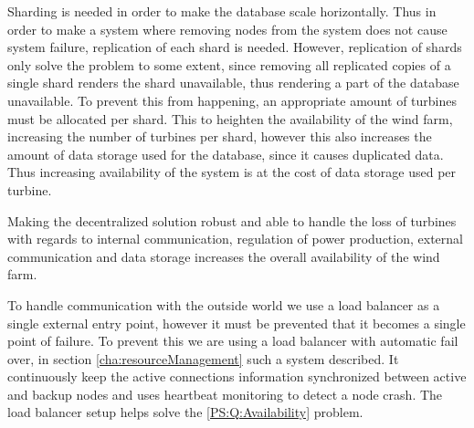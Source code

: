 Sharding is needed in order to make the database scale horizontally. Thus in order to make a system where removing nodes from the system does not cause system failure, replication of each shard is needed. However, replication of shards only solve the problem to some extent, since removing all replicated copies of a single shard renders the shard unavailable, thus rendering a part of the database unavailable. To prevent this from happening, an appropriate amount of turbines must be allocated per shard. This to heighten the availability of the wind farm, increasing the number of turbines per shard, however this also increases the amount of data storage used for the database, since it causes duplicated data. Thus increasing availability of the system is at the cost of data storage used per turbine.

Making the decentralized solution robust and able to handle the loss of turbines with regards to internal communication, regulation of power production, external communication and data storage increases the overall availability of the wind farm. %

To handle communication with the outside world we use a load balancer as a single external entry point, 
however it must be prevented that it becomes a single point of failure.
To prevent this we are using a load balancer with automatic fail over, in section \cref{cha:resourceManagement} such a system described.
It continuously keep the active connections information synchronized between active and backup nodes and uses heartbeat monitoring to detect a node crash.
The load balancer setup helps solve the \ref{PS:Q:Availability} problem.

\clearpage